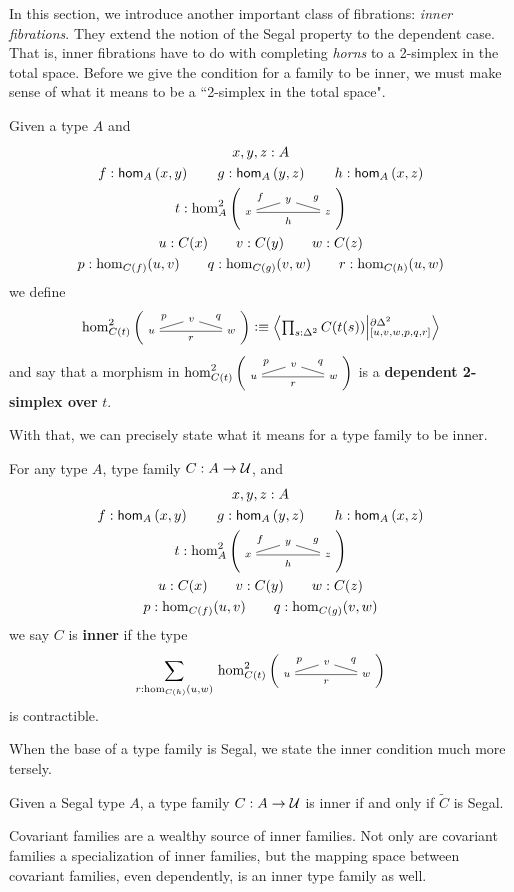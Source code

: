 \documentclass[main.tex]{subfiles}
\begin{document}
In this section, we introduce another important class of fibrations: \textit{inner fibrations}. They extend the notion of the Segal property to the dependent case. That is, 
inner fibrations have to do with completing \textit{horns} to a 2-simplex in the total space. Before we give the condition for a family
to be inner, we must make sense of what it means to be a ``2-simplex in the total space".
\begin{definition}
    Given a type $A$ and
    \begin{gather*}
                          x,y,z : A  \\
    f : \ho[A]{x}{y} \qquad g : \ho[A]{y}{z} \qquad h:\ho[A]{x}{z} \\
    t : \homtwo{A}(x,y,z,f,g,h)\\
    u : C(x) \qquad v : C(y) \qquad w : C(z) \\
    p : \dho{C}{f}{u}{v} \qquad q : \dho{C}{g}{v}{w} \qquad r : \dho{C}{h}{u}{w}
    \end{gather*}
    we define
    $$\homtwo{C(t)}(u,v,w,p,q,r) \defeq \exten{s : \tsx}{C(t(s))}{\pardt}{[u,v,w,p,q,r]}$$
    and say that a morphism in $\homtwo{C(t)}(u,v,w,p,q,r)$ is a \textbf{dependent 2-simplex over} $t$.
\end{definition}
With that, we can precisely state what it means for a type family to be inner.

\begin{definition}
    For any type $A$, type family $C : A \to \mathcal{U}$, and
    \begin{gather*}
    x,y,z : A  \\
    f : \ho[A]{x}{y} \qquad g : \ho[A]{y}{z} \qquad h:\ho[A]{x}{z} \\
    t : \homtwo{A}(x,y,z,f,g,h)\\
    u : C(x) \qquad v : C(y) \qquad w : C(z) \\
    p : \dho{C}{f}{u}{v} \qquad q : \dho{C}{g}{v}{w}  
    \end{gather*}
    we say $C$ is \textbf{inner} if the type 
    \begin{equation}
        \sm{r : \dho{C}{h}{u}{w}}\homtwo{C(t)}(u,v,w,p,q,r)
    \end{equation}
    is contractible.
\end{definition}

When the base of a type family is Segal, we state the inner condition much more tersely.
\begin{lemma}
    \label{lem:totbaseseginner}
    Given a Segal type $A$, a type family $C : A \to \mathcal{U}$ is inner if and only if $\widetilde{C}$ is Segal.
\end{lemma}
Covariant families are a wealthy source of inner families. Not only are covariant families a specialization of inner families, but the mapping space between covariant families, even dependently, is an inner type family as well. 
\end{document}
